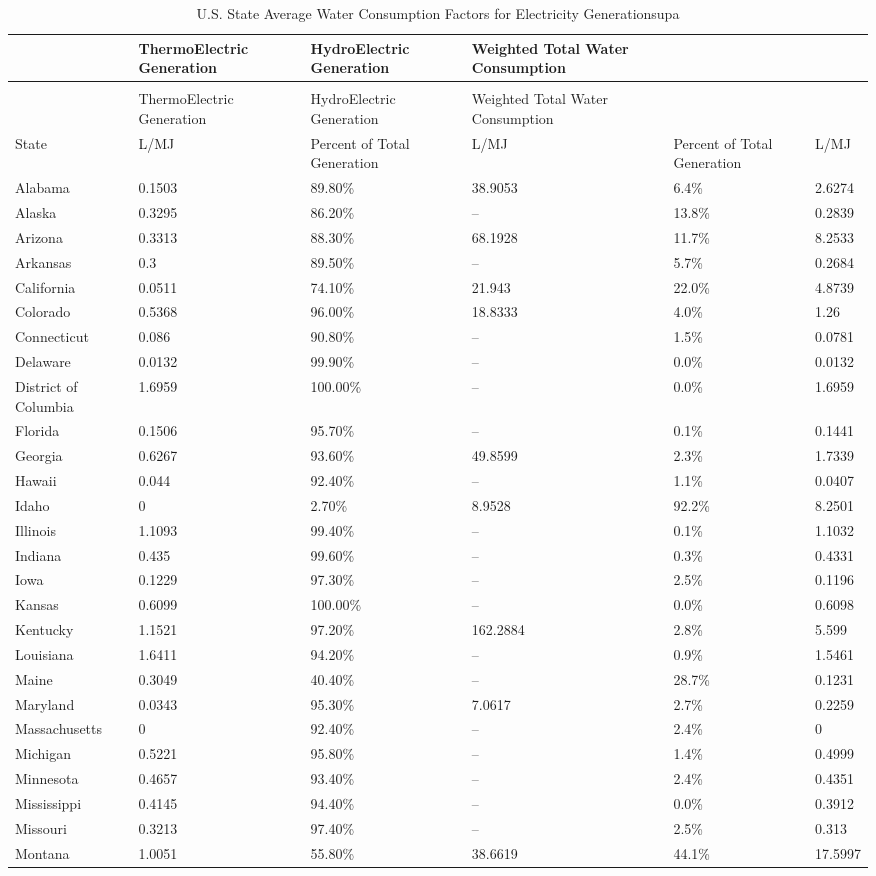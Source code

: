 \begin{longtable}[c]{p{1.0in}p{1.0in}p{1.0in}p{1.0in}p{1.0in}p{1.0in}}
\caption{U.S. State Average Water Consumption Factors for Electricity Generationsup{}a \label{table:u.s.-state-average-water-consumption-factors}} \tabularnewline
\toprule 
 & ThermoElectric Generation & HydroElectric Generation & Weighted Total Water Consumption \tabularnewline
\midrule
\endfirsthead

\caption[]{U.S. State Average Water Consumption Factors for Electricity Generationsup{}a} \tabularnewline
\toprule 
 & ThermoElectric Generation & HydroElectric Generation & Weighted Total Water Consumption \tabularnewline
\midrule
\endhead

State & L/MJ & Percent of Total Generation & L/MJ & Percent of Total Generation & L/MJ \tabularnewline
Alabama & 0.1503 & 89.80\% & 38.9053 & 6.4\% & 2.6274 \tabularnewline
Alaska & 0.3295 & 86.20\% & -- & 13.8\% & 0.2839 \tabularnewline
Arizona & 0.3313 & 88.30\% & 68.1928 & 11.7\% & 8.2533 \tabularnewline
Arkansas & 0.3 & 89.50\% & -- & 5.7\% & 0.2684 \tabularnewline
California & 0.0511 & 74.10\% & 21.943 & 22.0\% & 4.8739 \tabularnewline
Colorado & 0.5368 & 96.00\% & 18.8333 & 4.0\% & 1.26 \tabularnewline
Connecticut & 0.086 & 90.80\% & -- & 1.5\% & 0.0781 \tabularnewline
Delaware & 0.0132 & 99.90\% & -- & 0.0\% & 0.0132 \tabularnewline
District of Columbia & 1.6959 & 100.00\% & -- & 0.0\% & 1.6959 \tabularnewline
Florida & 0.1506 & 95.70\% & -- & 0.1\% & 0.1441 \tabularnewline
Georgia & 0.6267 & 93.60\% & 49.8599 & 2.3\% & 1.7339 \tabularnewline
Hawaii & 0.044 & 92.40\% & -- & 1.1\% & 0.0407 \tabularnewline
Idaho & 0 & 2.70\% & 8.9528 & 92.2\% & 8.2501 \tabularnewline
Illinois & 1.1093 & 99.40\% & -- & 0.1\% & 1.1032 \tabularnewline
Indiana & 0.435 & 99.60\% & -- & 0.3\% & 0.4331 \tabularnewline
Iowa & 0.1229 & 97.30\% & -- & 2.5\% & 0.1196 \tabularnewline
Kansas & 0.6099 & 100.00\% & -- & 0.0\% & 0.6098 \tabularnewline
Kentucky & 1.1521 & 97.20\% & 162.2884 & 2.8\% & 5.599 \tabularnewline
Louisiana & 1.6411 & 94.20\% & -- & 0.9\% & 1.5461 \tabularnewline
Maine & 0.3049 & 40.40\% & -- & 28.7\% & 0.1231 \tabularnewline
Maryland & 0.0343 & 95.30\% & 7.0617 & 2.7\% & 0.2259 \tabularnewline
Massachusetts & 0 & 92.40\% & -- & 2.4\% & 0 \tabularnewline
Michigan & 0.5221 & 95.80\% & -- & 1.4\% & 0.4999 \tabularnewline
Minnesota & 0.4657 & 93.40\% & -- & 2.4\% & 0.4351 \tabularnewline
Mississippi & 0.4145 & 94.40\% & -- & 0.0\% & 0.3912 \tabularnewline
Missouri & 0.3213 & 97.40\% & -- & 2.5\% & 0.313 \tabularnewline
Montana & 1.0051 & 55.80\% & 38.6619 & 44.1\% & 17.5997 \tabularnewline

\end{longtable}
